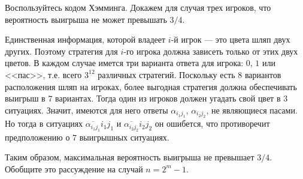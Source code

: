 \begin{ordre}
Воспользуйтесь кодом Хэмминга.
Докажем для случая трех игроков, что вероятность выигрыша не может превышать $3/4$. 

Единственная информация, которой владеет $i$-й игрок --- это цвета шляп двух других. Поэтому стратегия для $i$-го игрока должна зависеть 
только от этих двух цветов. В каждом случае имется три варианта ответа для игрока: $0$, $1$ или <<пас>>, т.е. всего $3^{12}$ различных 
стратегий. Поскольку есть $8$ вариантов расположения шляп на игроках, более выгодная стратегия должна обеспечивать выигрыш в $7$ вариантах. 
Тогда один из игроков должен угадать свой цвет в $3$ ситуациях. Значит, имеются для него ответы $\alpha_{i_1 j_1}$, 
$\alpha_{i_2 j_2}$, не являющиеся пасами. Но тогда в ситуациях $\overline{\alpha_{i_1 j_1}} i_1 j_1$ и 
$\overline{\alpha_{i_2 j_2}} i_2 j_2$ он ошибется, что противоречит предположению о $7$ выигрышных ситуациях. 

Таким образом, максимальная вероятность выигрыша не превышает $3/4$.
Обобщите это рассуждение на случай $n = 2^m - 1$.
\end{ordre}

